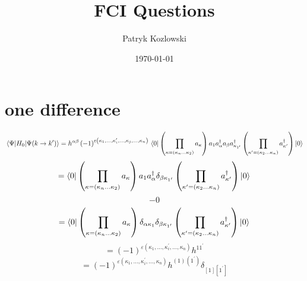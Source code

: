 \documentclass[12pt]{article}
\title{FCI Questions}
\author{Patryk Kozlowski}
\date{\today}
\begin{document}
\maketitle
\section{one difference}
\begin{equation}
    \mel{\Psi }{H_{0}}{\Psi (k\rightarrow k^{\prime})}=h^{\alpha\beta}\left(-1\right)^{\varepsilon\left(\kappa_{1},\dots,\kappa_{i}^{\prime},\dots,\kappa _{j},...,\kappa_{n}\right)}\\
    \bra{0}\left(\prod_{\kappa=\left(\kappa_{n}\dots\kappa_{2}\right)}a_{\kappa}\right)
        a_{1}a^{\dag}_{\alpha  }a_{\beta }a^{\dag}_{\kappa _{1^{\prime}}}
    \left(\prod_{\kappa^{\prime}=\left(\kappa_{2}\dots\kappa_{n}\right)}a^{\dag}_{\kappa^{\prime}}\right)\ket{0}
\end{equation}
\begin{equation}
    =\bra{0}\left(\prod_{\kappa=\left(\kappa_{n}\dots\kappa_{2}\right)}a_{\kappa}\right)
        a_{1}a^{\dag}_{\alpha }\delta _{\beta  \kappa _{1^{\prime}}}
    \left(\prod_{\kappa^{\prime}=\left(\kappa_{2}\dots\kappa_{n}\right)}a^{\dag}_{\kappa^{\prime}}\right)\ket{0}
\end{equation}
\begin{equation}
    -0
\end{equation}
\begin{equation}
    =\bra{0}\left(\prod_{\kappa=\left(\kappa_{n}\dots\kappa_{2}\right)}a_{\kappa}\right)
        \delta _{\alpha  \kappa _{1}}\delta _{\beta  \kappa _{1^{\prime}}}
    \left(\prod_{\kappa^{\prime}=\left(\kappa_{2}\dots\kappa_{n}\right)}a^{\dag}_{\kappa^{\prime}}\right)\ket{0}
\end{equation}
\begin{equation}
    =\left(-1\right)^{\varepsilon\left(\kappa_{1},\dots,\kappa_{i}^{\prime},\dots,\kappa_{n}\right)}h^{11^{\prime}}
\end{equation}
\begin{equation}
    =\left(-1\right)^{\varepsilon\left(\kappa_{1},\dots,\kappa_{i}^{\prime},\dots,\kappa_{n}\right)}h^{(1)(1^{\prime})}\delta _{[1][1^{\prime}]}
\end{equation}
\end{document}

